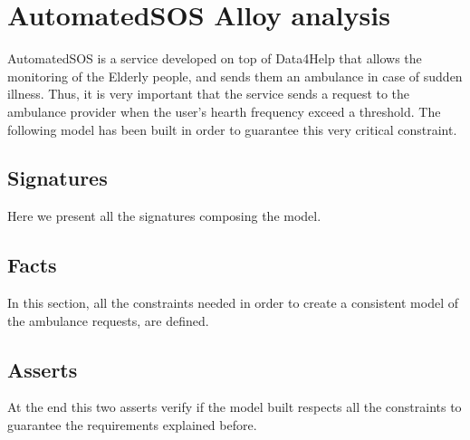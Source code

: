 \section{AutomatedSOS Alloy analysis}

    AutomatedSOS is a service developed on top of Data4Help that allows the monitoring of the Elderly people, and sends them an ambulance in case of sudden illness. Thus, it is very important that the service sends a request to the ambulance provider when the user's hearth frequency exceed a threshold. The following model has been built in order to guarantee this very critical constraint.
    
    \subsection{Signatures}
        
        Here we present all the signatures composing the model.
        
        
    
    \subsection{Facts}
 
        In this section, all the constraints needed in order to create a consistent model of the ambulance requests, are defined.
    
        

    \subsection{Asserts}
    
        At the end this two asserts verify if the model built respects all the constraints to guarantee the requirements explained before.
    
        